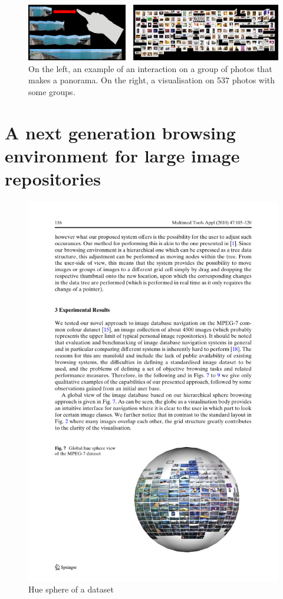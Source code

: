 \begin{figure}[ht]
	\centering
		\includegraphics[width=\textwidth]{imgs-RelatedWork/hsu.png}
	\caption{On the left, an example of an interaction on a group of photos that makes a panorama. On the right, a visualisation on 537 photos with some groups.}
	\label{fig:hsu1}
\end{figure}



\section{A next generation browsing environment for large image repositories} %
\label{sub:Schaefer}

\begin{figure}[ht]
	\centering
		\includegraphics[scale=1]{imgs-RelatedWork/shaefer1.pdf}
	\caption{Hue sphere of a dataset}
	\label{fig:schaefer1}
\end{figure}

